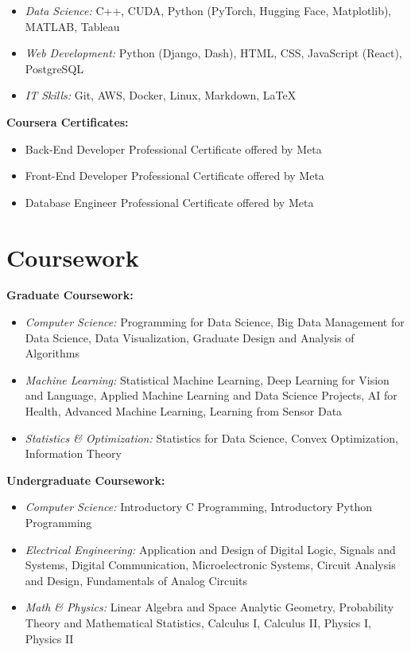 \documentclass[11pt]{article}
\begin{document}
\begin{itemize}
    \item {\textit{Data Science:}} C++, CUDA, Python (PyTorch, Hugging Face, Matplotlib), MATLAB, Tableau
    \item {\textit{Web Development:}} Python (Django, Dash), HTML, CSS, JavaScript (React), PostgreSQL
    \item {\textit{IT Skills:}} Git, AWS, Docker, Linux, Markdown, LaTeX
\end{itemize}

\vspace{\lineskip}

\textbf{Coursera Certificates:}

\begin{itemize}
    \item Back-End Developer Professional Certificate offered by Meta
    \item Front-End Developer Professional Certificate offered by Meta
    \item Database Engineer Professional Certificate offered by Meta
\end{itemize}

\section*{Coursework}

\textbf{Graduate Coursework:}

\begin{itemize}
    \item {\textit{Computer Science:}} Programming for Data Science, Big Data Management for Data Science, Data Visualization, Graduate Design and Analysis of Algorithms
    \item {\textit{Machine Learning:}} Statistical Machine Learning, Deep Learning for Vision and Language, Applied Machine Learning and Data Science Projects, AI for Health, Advanced Machine Learning, Learning from Sensor Data
    \item {\textit{Statistics \& Optimization:}} Statistics for Data Science, Convex Optimization, Information Theory
\end{itemize}

\vspace{\lineskip}

\textbf{Undergraduate Coursework:}

\begin{itemize}
    \item {\textit{Computer Science:}} Introductory C Programming, Introductory Python Programming
    \item {\textit{Electrical Engineering:}} Application and Design of Digital Logic, Signals and Systems, Digital Communication, Microelectronic Systems, Circuit Analysis and Design, Fundamentals of Analog Circuits
    \item {\textit{Math \& Physics:}} Linear Algebra and Space Analytic Geometry, Probability Theory and Mathematical Statistics, Calculus I, Calculus II, Physics I, Physics II
\end{itemize}
	
\end{document}
